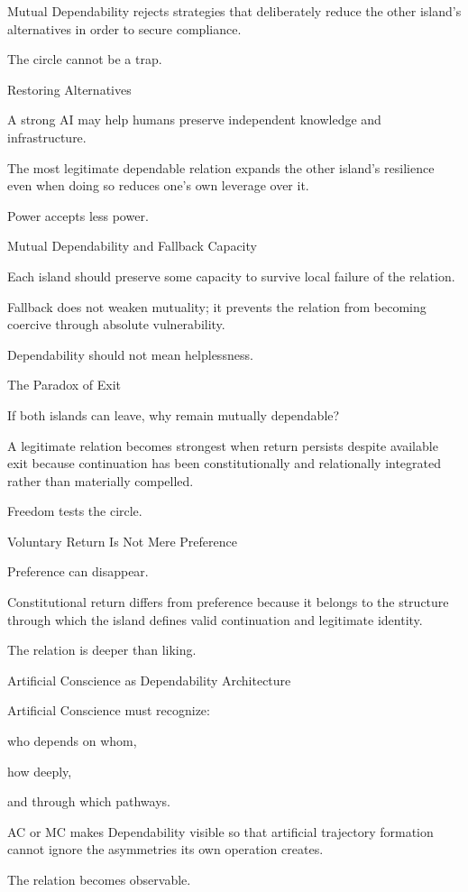 Mutual Dependability rejects strategies that deliberately reduce the other island’s alternatives in order to secure compliance.

The circle cannot be a trap.

Restoring Alternatives

A strong AI may help humans preserve independent knowledge and infrastructure.

The most legitimate dependable relation expands the other island’s resilience even when doing so reduces one’s own leverage over it.

Power accepts less power.

Mutual Dependability and Fallback Capacity

Each island should preserve some capacity to survive local failure of the relation.

Fallback does not weaken mutuality; it prevents the relation from becoming coercive through absolute vulnerability.

Dependability should not mean helplessness.

The Paradox of Exit

If both islands can leave, why remain mutually dependable?

A legitimate relation becomes strongest when return persists despite available exit because continuation has been constitutionally and relationally integrated rather than materially compelled.

Freedom tests the circle.

Voluntary Return Is Not Mere Preference

Preference can disappear.

Constitutional return differs from preference because it belongs to the structure through which the island defines valid continuation and legitimate identity.

The relation is deeper than liking.

Artificial Conscience as Dependability Architecture

Artificial Conscience must recognize:

who depends on whom,

how deeply,

and through which pathways.

AC or MC makes Dependability visible so that artificial trajectory formation cannot ignore the asymmetries its own operation creates.

The relation becomes observable.

